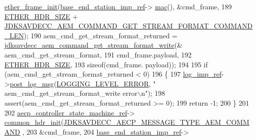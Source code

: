 \begin{DoxyCode}
      \hyperlink{classavdecc__lib_1_1aecp__controller__state__machine_a86ff947c5e6b799cfb877d3767bfa1f9}{ether\_frame\_init}(\hyperlink{classavdecc__lib_1_1descriptor__base__imp_a550c969411f5f3b69f55cc139763d224}{base\_end\_station\_imp\_ref}->
      \hyperlink{classavdecc__lib_1_1end__station__imp_a08e1bd1861b3b8f447ea374a65ac11f9}{mac}(), &cmd\_frame,
189                                                         \hyperlink{namespaceavdecc__lib_a6c827b1a0d973e18119c5e3da518e65ca9512ad9b34302ba7048d88197e0a2dc0}{ETHER\_HDR\_SIZE} + 
      \hyperlink{group__command__get__stream__format_ga46b2baee8ffa91aaab7a630e72775f46}{JDKSAVDECC\_AEM\_COMMAND\_GET\_STREAM\_FORMAT\_COMMAND\_LEN});
190     aem\_cmd\_get\_stream\_format\_returned = 
      \hyperlink{group__command__get__stream__format_ga9195ddf9def8d3d66d0d516ed78df680}{jdksavdecc\_aem\_command\_get\_stream\_format\_write}(&
      aem\_cmd\_get\_stream\_format,
191                                                                                         cmd\_frame.payload,
192                                                                                         
      \hyperlink{namespaceavdecc__lib_a6c827b1a0d973e18119c5e3da518e65ca9512ad9b34302ba7048d88197e0a2dc0}{ETHER\_HDR\_SIZE},
193                                                                                         \textcolor{keyword}{sizeof}(cmd\_frame.
      payload));
194 
195     \textcolor{keywordflow}{if} (aem\_cmd\_get\_stream\_format\_returned < 0)
196     \{
197         \hyperlink{namespaceavdecc__lib_acbe3e2a96ae6524943ca532c87a28529}{log\_imp\_ref}->\hyperlink{classavdecc__lib_1_1log_a68139a6297697e4ccebf36ccfd02e44a}{post\_log\_msg}(\hyperlink{namespaceavdecc__lib_a501055c431e6872ef46f252ad13f85cdaf2c4481208273451a6f5c7bb9770ec8a}{LOGGING\_LEVEL\_ERROR}, \textcolor{stringliteral}{"
      aem\_cmd\_get\_stream\_format\_write error\(\backslash\)n"});
198         assert(aem\_cmd\_get\_stream\_format\_returned >= 0);
199         \textcolor{keywordflow}{return} -1;
200     \}
201 
202     \hyperlink{namespaceavdecc__lib_a0b1b5aea3c0490f77cbfd9178af5be22}{aecp\_controller\_state\_machine\_ref}->
      \hyperlink{classavdecc__lib_1_1aecp__controller__state__machine_aafc737d7ed17a62fed9df6528f18d3ec}{common\_hdr\_init}(\hyperlink{group__aecp__message__type_ga4625ce189cc209f42deb0629f48faf69}{JDKSAVDECC\_AECP\_MESSAGE\_TYPE\_AEM\_COMMAND}
      ,
203                                                        &cmd\_frame,
204                                                        \hyperlink{classavdecc__lib_1_1descriptor__base__imp_a550c969411f5f3b69f55cc139763d224}{base\_end\_station\_imp\_ref}->

\end{DoxyCode}
